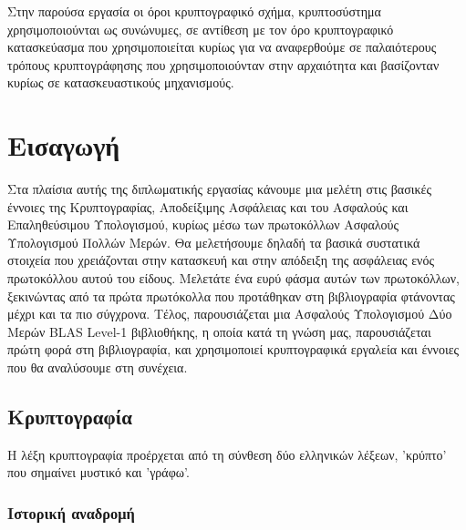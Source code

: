 \newpage

Στην παρούσα εργασία οι όροι κρυπτογραφικό σχήμα, κρυπτοσύστημα χρησιμοποιούνται ως συνώνυμες, σε αντίθεση με τον όρο κρυπτογραφικό κατασκεύασμα που χρησιμοποιείται κυρίως για να αναφερθούμε σε παλαιότερους τρόπους κρυπτογράφησης που χρησιμοποιούνταν στην αρχαιότητα και βασίζονταν κυρίως σε κατασκευαστικούς μηχανισμούς.

\chapter{Εισαγωγή}

\label{chapter:intro}

Στα πλαίσια αυτής της διπλωματικής εργασίας κάνουμε μια μελέτη στις βασικές έννοιες της Κρυπτογραφίας, Αποδείξιμης Ασφάλειας και του Ασφαλούς και Επαληθεύσιμου Υπολογισμού, κυρίως μέσω των πρωτοκόλλων Ασφαλούς Υπολογισμού Πολλών Μερών. Θα μελετήσουμε δηλαδή τα βασικά συστατικά στοιχεία που χρειάζονται στην κατασκευή και στην απόδειξη της ασφάλειας ενός πρωτοκόλλου αυτού του είδους. Μελετάτε ένα ευρύ φάσμα αυτών των πρωτοκόλλων, ξεκινώντας από τα πρώτα πρωτόκολλα που προτάθηκαν στη βιβλιογραφία φτάνοντας μέχρι και τα πιο σύγχρονα. Τέλος, παρουσιάζεται μια Ασφαλούς Υπολογισμού Δύο Μερών BLAS Level-1 βιβλιοθήκης, η οποία κατά τη γνώση μας, παρουσιάζεται πρώτη φορά στη βιβλιογραφία, και χρησιμοποιεί κρυπτογραφικά εργαλεία και έννοιες που θα αναλύσουμε στη συνέχεια.


\section{Κρυπτογραφία}

Η λέξη κρυπτογραφία προέρχεται από τη σύνθεση δύο ελληνικών λέξεων, 'κρύπτο' που σημαίνει μυστικό και 'γράφω'.

\subsection{Ιστορική αναδρομή}

